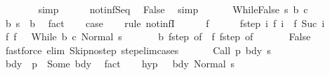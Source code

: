 \begin{isabellebody}
\ \ \ \ \ \ \isamarkupfalse%
\ simp\isanewline
\ \ \ \ \isamarkupfalse%
\ not{\isacharunderscore}inf{\isacharunderscore}Seq\ \isamarkupfalse%
\ False\ \isamarkupfalse%
\ simp\isanewline
\ \ \isamarkupfalse%
\isanewline
{}\isamarkupfalse%
\isanewline
\ \ \isamarkupfalse%
\ {\isacharparenleft}WhileFalse\ s\ b\ c{\isacharparenright}\isanewline
\ \ \isamarkupfalse%
\ b{\isacharcolon}\ {\isachardoublequoteopen}s\ {\isasymnotin}\ b{\isachardoublequoteclose}\ \isamarkupfalse%
\ fact\isanewline
\ \ \isamarkupfalse%
\ {\isacharquery}case\isanewline
\ \ \isamarkupfalse%
\ {\isacharparenleft}rule\ not{\isacharunderscore}infI{\isacharparenright}\isanewline
\ \ \ \ \isamarkupfalse%
\ f\isanewline
\ \ \ \ \isamarkupfalse%
\ f{\isacharunderscore}step{\isacharcolon}\ {\isachardoublequoteopen}{\isasymAnd}i{\isachardot}\ {\isasymGamma}{\isasymturnstile}f\ i\ {\isasymrightarrow}\ f\ {\isacharparenleft}Suc\ i{\isacharparenright}{\isachardoublequoteclose}\isanewline
\ \ \ \ \isamarkupfalse%
\ f{\isacharunderscore}{}{\isacharcolon}\ {\isachardoublequoteopen}f\ {}\ {\isacharequal}\ {\isacharparenleft}While\ b\ c{\isacharcomma}\ Normal\ s{\isacharparenright}{\isachardoublequoteclose}\ \isanewline
\ \ \ \ \isamarkupfalse%
\ b\ f{\isacharunderscore}step\ {\isacharbrackleft}of\ {}{\isacharbrackright}\ f{\isacharunderscore}{}\ f{\isacharunderscore}step\ {\isacharbrackleft}of\ {}{\isacharbrackright}\isanewline
\ \ \ \ \isamarkupfalse%
\ False\isanewline
\ \ \ \ \ \ \isamarkupfalse%
\ {\isacharparenleft}fastforce\ elim{\isacharcolon}\ Skip{\isacharunderscore}no{\isacharunderscore}step\ step{\isacharunderscore}elim{\isacharunderscore}cases{\isacharparenright}\isanewline
\ \ \isamarkupfalse%
\isanewline
{}\isamarkupfalse%
\isanewline
\ \ \isamarkupfalse%
\ {\isacharparenleft}Call\ p\ bdy\ s{\isacharparenright}\isanewline
\ \ \isamarkupfalse%
\ bdy{\isacharcolon}\ {\isachardoublequoteopen}{\isasymGamma}\ p\ {\isacharequal}\ Some\ bdy{\isachardoublequoteclose}\ \isamarkupfalse%
\ fact\isanewline
\ \ \isamarkupfalse%
\ hyp{\isacharcolon}\ {\isachardoublequoteopen}{\isasymnot}\ {\isasymGamma}{\isasymturnstile}\ {\isacharparenleft}bdy{\isacharcomma}\ Normal\ s{\isacharparenright}\ {\isasymrightarrow}\ {\isasymdots}{\isacharparenleft}{\isasyminfinity}{\isacharparenright}{\isachardoublequoteclose}\ \isamarkupfalse%

\end{isabellebody}
